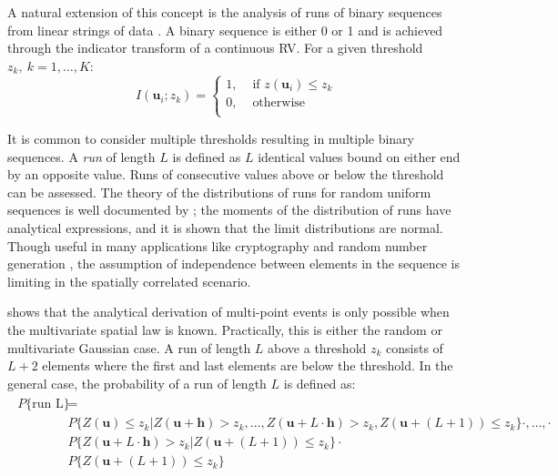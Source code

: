 A natural extension of this concept is the analysis of runs of binary sequences from linear strings of data \citep{ortiz2003characterization}. A binary sequence is either 0 or 1 and is achieved through the indicator transform of a continuous \gls{RV}. For a given threshold $z_{k}, \ k=1,\dots,K$:
\begin{equation}
    I(\mathbf{u}_{i};z_{k}) =
    \begin{cases}
        1, & \text{ if }z(\mathbf{u}_{i}) \leq z_{k} \\
        0, & \text{ otherwise }                      \\
    \end{cases}
    \label{eq:indicator}
\end{equation}

It is common to consider multiple thresholds resulting in multiple binary sequences. A \emph{run} of length $L$ is defined as $L$ identical values bound on either end by an opposite value. Runs of consecutive values above or below the threshold can be assessed. The theory of the distributions of runs for random uniform sequences is well documented by \cite{mood1940distribution}; the moments of the distribution of runs have analytical expressions, and it is shown that the limit distributions are normal. Though useful in many applications like cryptography and random number generation \citep{rukhin2010statistical}, the assumption of independence between elements in the sequence is limiting in the spatially correlated scenario.

\cite{ortiz2003characterization} shows that the analytical derivation of multi-point events is only possible when the multivariate spatial law is known. Practically, this is either the random or multivariate Gaussian case. A run of length $L$ above a threshold $z_{k}$ consists of $L+2$ elements where the first and last elements are below the threshold. In the general case, the probability of a run of length $L$ is defined as:
\begin{align}
    \begin{split}
        P\{\text{run L}\} & =                                                                                                                                                                \\
                          & P\{Z(\mathbf{u}) \leq z_{k}| Z(\mathbf{u + h}) > z_{k},\dots, Z(\mathbf{u} + L \cdot \mathbf{h}) > z_{k}, Z(\mathbf{u} + (L+1)) \leq z_{k}\} \cdot ,\dots, \cdot \\
                          & P\{Z(\mathbf{u} + L \cdot \mathbf{h}) > z_{k} | Z(\mathbf{u} + (L+1)) \leq z_{k}\} \cdot                                                                         \\
                          & P\{Z(\mathbf{u} + (L+1)) \leq z_{k}\}
    \end{split}
\end{align}

